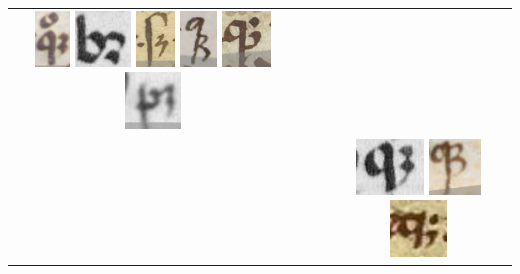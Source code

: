 \documentclass{article}
\begin{document}
\begin{table}[H]
{{\begin{tabular}{c|c|c|c}
            \includegraphics[height=1.5cm]{datapaper/images/examples/que/-que_CML13027.png}
            \includegraphics[height=1.5cm]{datapaper/images/examples/que/que_2_Latin6395.png}
            \includegraphics[height=1.5cm]{datapaper/images/examples/que/que_2_Phil10a135.png}
            \includegraphics[height=1.5cm]{datapaper/images/examples/que/que_CCCC165n.png}
            \includegraphics[height=1.5cm]{datapaper/images/examples/que/que_egerton821.png}
            \includegraphics[height=1.5cm]{datapaper/images/examples/que/que_Latin 16195.png}
            \\ %
         & & &
            \includegraphics[height=1.5cm]{datapaper/images/examples/que/que_Latin6395.png}
             \includegraphics[height=1.5cm]{datapaper/images/examples/que/que_Laurentianus39.34.png}
            \includegraphics[height=1.5cm]{datapaper/images/examples/que/que_Montpelier.H 318.png}

\end{tabular}}}
\end{table}
\end{document}
